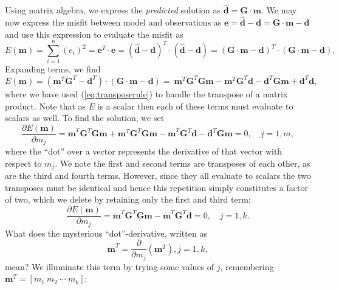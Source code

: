 Using matrix algebra, we express the \emph{predicted} solution as $\hat{\mathbf{d}} = \mathbf{G \cdot m}$.
We may now express the misfit
between model and observations as $\mathbf{e} = \hat{\mathbf{d}} - \mathbf{d} = \mathbf{G \cdot m} - \mathbf{d}$
and use this expression to evaluate the misfit as
\begin{equation}
E(\mathbf{m}) = \sum ^n _{i=1}  (e_i)^2  = \mathbf{e}^T \cdot \mathbf{e} = \left(\hat{\mathbf{d}} - \mathbf{d}\right)^T\cdot \left(\hat{\mathbf{d}} - \mathbf{d}\right) = \left(\mathbf{G \cdot m} - \mathbf{d}\right)^T \cdot \left(\mathbf{G \cdot m} - \mathbf{d}\right).
\end{equation}
Expanding terms, we find
\begin{equation}
E(\mathbf{m}) =  \left(\mathbf{m}^T\mathbf{G}^T - \mathbf{d}^T\right) \cdot \left(\mathbf{G \cdot m} - \mathbf{d}\right) = \
\mathbf{m}^T\mathbf{G}^T\mathbf{Gm} - \mathbf{m}^T\mathbf{G}^T\mathbf{d} - \mathbf{d}^T\mathbf{Gm} + \mathbf{d}^T\mathbf{d},
\end{equation}
where we have used (\ref{eq:transposerule}) to handle the transpose of a matrix product.
Note that as $E$ is a scalar then each of these terms must evaluate to scalars as well.  To find the solution, we set
\begin{equation}
\frac{\partial E(\mathbf{m})}{\partial m_j} = \mathbf{\dot{m}}^T\mathbf{G}^T\mathbf{Gm} + \mathbf{m}^T\mathbf{G}^T\mathbf{G\dot{m}} - \mathbf{\dot{m}}^T\mathbf{G}^T\mathbf{d} - \mathbf{d}^T\mathbf{G\dot{m}} = 0, \quad j = 1,m,
\end{equation}
where the ``dot'' over a vector represents the derivative of that vector with respect to $m_j$.
We note the first and second terms are transposes of each other, as are the third and fourth terms.
However, since they all evaluate to scalars the two transposes must be identical and hence this
repetition simply constitutes a factor of two, which we delete by retaining only the first and third term:
\begin{equation}
\frac{\partial E(\mathbf{m})}{\partial m_j} = \mathbf{\dot{m}}^T\mathbf{G}^T\mathbf{Gm} - \mathbf{\dot{m}}^T\mathbf{G}^T\mathbf{d} = 0, \quad j = 1,k.
\end{equation}
What does the mysterious ``dot''-derivative, written as
\begin{equation}
\mathbf{\dot{m}}^T = \frac{\partial}{\partial m_j} \left (\mathbf{m}^T \right), j = 1,k,
\end{equation}
mean? We illuminate this term by trying some values of $j$, remembering $\mathbf{m}^T = [m_1\ m_2 \ \cdots \ m_k ]$:
